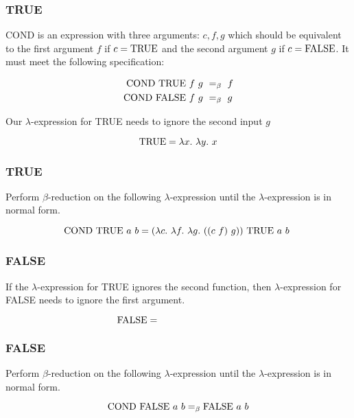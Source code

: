 \documentclass{beamer}
\begin{document}
\begin{frame}
	\frametitle{TRUE}

	COND is an expression with three arguments: $c,f,g$ which should be equivalent to the first argument $f$ if $c = \text{TRUE}$ and the second argument $g$ if $c = \text{FALSE}$. It must meet the following specification: 

	\begin{align*}
		\text{COND} \ \text{TRUE} \ f \ g \ &=_{\beta} \ f \\
		\text{COND} \ \text{FALSE} \ f \ g \ &=_{\beta} \ g 
	\end{align*}

	Our $\lambda$-expression for TRUE needs to ignore the second input $g$ 

	$$\TRUE = \lambda x. \ \lambda y. \ x$$


	
\end{frame}

\begin{frame}
	\frametitle{TRUE}

	Perform $\beta$-reduction on the following $\lambda$-expression until the $\lambda$-expression is in normal form. 

	$$ \COND \ \TRUE \ a \ b = (\lambda c. \ \lambda f. \ \lambda g. \  ((c \ f) \ g) ) \ \TRUE \ a \ b \ $$

	\vspace{5cm}

\end{frame}


\begin{frame}
	\frametitle{FALSE}
	
	If the $\lambda$-expression for TRUE ignores the second function, then $\lambda$-expression for FALSE needs to ignore the first argument.

	$$ \FALSE =\hspace{3cm} $$

	\vspace{5cm}
	
\end{frame}

\begin{frame}
	\frametitle{FALSE}

	Perform $\beta$-reduction on the following $\lambda$-expression until the $\lambda$-expression is in normal form. 

	$$ \text{COND} \ \text{FALSE} \ a \ b =_{\beta} \text{FALSE} \ a \ b$$

	\vspace{5cm}

\end{frame}
\end{document}
